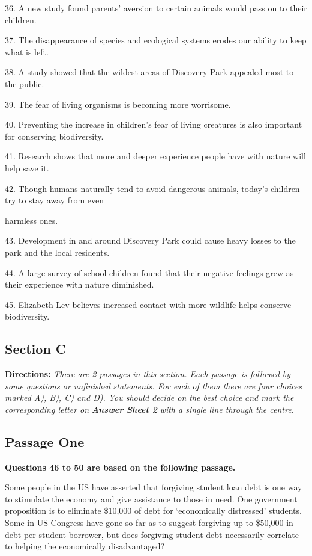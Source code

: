 \documentclass[UTF8,11pt]{ctexart}
\begin{document}
36. A new study found parents’ aversion to certain animals would pass on to their children.


37. The disappearance of species and ecological systems erodes our ability to keep what is left.


38. A study showed that the wildest areas of Discovery Park appealed most to the public.


39. The fear of living organisms is becoming more worrisome.


40. Preventing the increase in children’s fear of living creatures is also important for conserving biodiversity.


41. Research shows that more and deeper experience people have with nature will help save it.


42. Though humans naturally tend to avoid dangerous animals, today’s children try to stay away from even


harmless ones.


43. Development in and around Discovery Park could cause heavy losses to the park and the local residents.


44. A large survey of school children found that their negative feelings grew as their experience with nature diminished.


45. Elizabeth Lev believes increased contact with more wildlife helps conserve biodiversity.


\subsection*{\textbf{Section C}}


\textbf{Directions: }\textit{There are 2 passages in this section. Each passage is followed by some questions or unfinished} \textit{statements. For each of them there are four choices marked A), B), C) and D). You should decide on the best choice} \textit{and mark the corresponding letter on }\textbf{\textit{Answer Sheet 2}}\textit{ with a single line through the centre.}


\subsection*{\textbf{Passage One}}


\textbf{Questions 46 to 50 are based on the following passage.}


Some people in the US have asserted that forgiving student loan debt is one way to stimulate the economy and give assistance to those in need. One government proposition is to eliminate \$10,000 of debt for ‘economically distressed’ students. Some in US Congress have gone so far as to suggest forgiving up to \$50,000 in debt per student borrower, but does forgiving student debt necessarily correlate to helping the economically disadvantaged?
\end{document}
